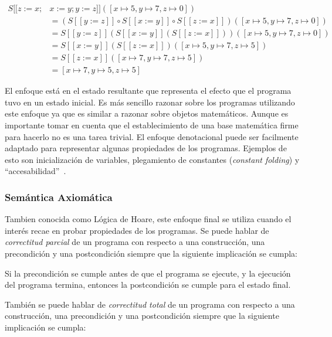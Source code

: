 \begin{align*}
S [\![ z:=x; & x:=y; y:=z ]\!]([x\mapsto5, y\mapsto7, z\mapsto0])\\
&= (S [\![ y:=z ]\!] \circ S [\![ x:=y ]\!] \circ S [\![ z:=x ]\!])([x\mapsto5, y\mapsto7, z\mapsto0])\\
&= S [\![ y:=z ]\!](S [\![ x:=y ]\!] (S [\![ z:=x ]\!]))([x\mapsto5, y\mapsto7, z\mapsto0])\\
&= S [\![ x:=y ]\!] (S [\![ z:=x ]\!])([x\mapsto5, y\mapsto7, z\mapsto5])\\
&= S [\![ z:=x ]\!]([x\mapsto7, y\mapsto7, z\mapsto5])\\
&= [x\mapsto7, y\mapsto5, z\mapsto5]
\end{align*}

El enfoque está en el estado resultante que representa el efecto que el programa tuvo en un estado inicial.
Es más sencillo razonar sobre los programas utilizando este enfoque ya que es similar a razonar sobre objetos matemáticos.
Aunque es importante tomar en cuenta que el establecimiento de una base matemática firme para hacerlo no es una tarea trivial.
El enfoque denotacional puede ser facilmente adaptado para representar algunas propiedades de los programas.
Ejemplos de esto son inicialización de variables, plegamiento de constantes (\textit{constant folding}) y ``accesabilidad''~\cite{nielson}.


\subsubsection*{Semántica Axiomática}

\begin{comment}
FIXME construcción
\end{comment}
Tambien conocida como Lógica de Hoare, este enfoque final se utiliza cuando el interés recae en probar propiedades de los programas.
Se puede hablar de \textit{correctitud parcial} de un programa con respecto a una construcción, una precondición y una postcondición siempre que la siguiente implicación se cumpla:

\begin{displayquote}
Si la precondición se cumple antes de que el programa se ejecute, y la ejecución del programa termina, entonces la postcondición se cumple para el estado final.
\end{displayquote}

También se puede hablar de \textit{correctitud total} de un programa con respecto a una construcción, una precondición y una postcondición siempre que la siguiente implicación se cumpla:

